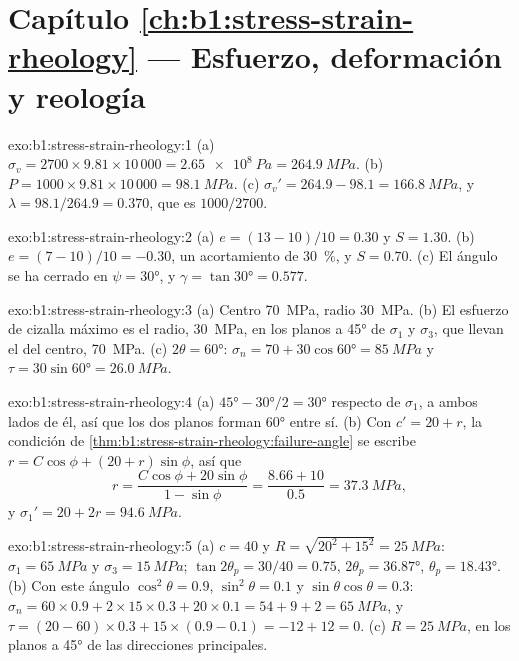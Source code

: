 \section*{Capítulo \ref{ch:b1:stress-strain-rheology} --- Esfuerzo, deformación y reología}

\begin{solution}{exo:b1:stress-strain-rheology:1}
(a) $\sigma_v = 2700\times9.81\times10\,000 = \qty{2.65e8}{Pa} = \qty{264.9}{MPa}$.
(b) $P = 1000\times9.81\times10\,000 = \qty{98.1}{MPa}$. (c) $\sigma_v' =
264.9 - 98.1 = \qty{166.8}{MPa}$, y $\lambda = 98.1/264.9 = 0.370$, que es
$1000/2700$.
\end{solution}

\begin{solution}{exo:b1:stress-strain-rheology:2}
(a) $e = (13-10)/10 = 0.30$ y $S = 1.30$. (b) $e = (7-10)/10 = -0.30$, un
acortamiento de \qty{30}{\percent}, y $S = 0.70$. (c) El ángulo se ha cerrado en
$\psi = \ang{30}$, y $\gamma = \tan\ang{30} = 0.577$.
\end{solution}

\begin{solution}{exo:b1:stress-strain-rheology:3}
(a) Centro \qty{70}{MPa}, radio \qty{30}{MPa}. (b) El esfuerzo de cizalla máximo
es el radio, \qty{30}{MPa}, en los planos a \ang{45} de $\sigma_1$ y
$\sigma_3$, que llevan el  del centro, \qty{70}{MPa}. (c)
$2\theta = \ang{60}$: $\sigma_n = 70 + 30\cos\ang{60} = \qty{85}{MPa}$ y
$\tau = 30\sin\ang{60} = \qty{26.0}{MPa}$.
\end{solution}

\begin{solution}{exo:b1:stress-strain-rheology:4}
(a) $\ang{45} - \ang{30}/2 = \ang{30}$ respecto de $\sigma_1$, a ambos lados de
él, así que los dos planos forman \ang{60} entre sí. (b) Con $c' = 20 + r$, la
condición de \cref{thm:b1:stress-strain-rheology:failure-angle} se escribe
$r = C\cos\phi + (20 + r)\sin\phi$, así que
\[
  r = \frac{C\cos\phi + 20\sin\phi}{1 - \sin\phi} = \frac{8.66 + 10}{0.5}
    = \qty{37.3}{MPa},
\]
y $\sigma_1' = 20 + 2r = \qty{94.6}{MPa}$.
\end{solution}

\begin{solution}{exo:b1:stress-strain-rheology:5}
(a) $c = 40$ y $R = \sqrt{20^2 + 15^2} = \qty{25}{MPa}$: $\sigma_1 =
\qty{65}{MPa}$ y $\sigma_3 = \qty{15}{MPa}$; $\tan2\theta_p = 30/40 = 0.75$,
$2\theta_p = \ang{36.87}$, $\theta_p = \ang{18.43}$. (b) Con este ángulo
$\cos^2\theta = 0.9$, $\sin^2\theta = 0.1$ y $\sin\theta\cos\theta = 0.3$:
$\sigma_n = 60\times0.9 + 2\times15\times0.3 + 20\times0.1 = 54 + 9 + 2 =
\qty{65}{MPa}$, y $\tau = (20-60)\times0.3 + 15\times(0.9-0.1) = -12 + 12 =
0$. (c) $R = \qty{25}{MPa}$, en los planos a \ang{45} de las direcciones
principales.
\end{solution}

